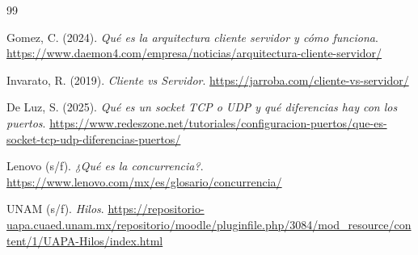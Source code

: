 \documentclass{article}
\begin{document}
\begin{thebibliography}{99}

    Gomez, C. (2024). \textit{Qué es la arquitectura cliente servidor y cómo funciona}. \url{https://www.daemon4.com/empresa/noticias/arquitectura-cliente-servidor/}

    Invarato, R. (2019). \textit{Cliente vs Servidor}. \url{https://jarroba.com/cliente-vs-servidor/}

    De Luz, S. (2025). \textit{Qué es un socket TCP o UDP y qué diferencias hay con los puertos}. \url{https://www.redeszone.net/tutoriales/configuracion-puertos/que-es-socket-tcp-udp-diferencias-puertos/}

    Lenovo (s/f). \textit{¿Qué es la concurrencia?}. \url{https://www.lenovo.com/mx/es/glosario/concurrencia/}

    UNAM (s/f). \textit{Hilos}. \url{https://repositorio-uapa.cuaed.unam.mx/repositorio/moodle/pluginfile.php/3084/mod_resource/content/1/UAPA-Hilos/index.html}

\end{thebibliography}
\end{document}
